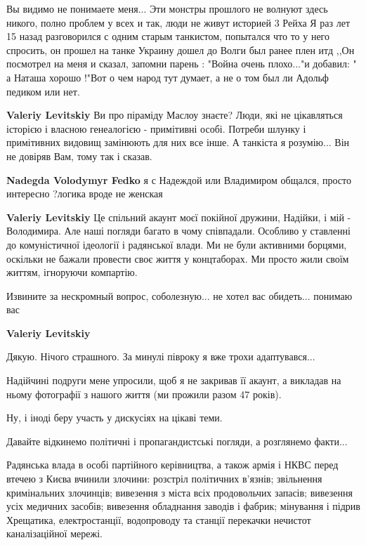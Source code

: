 \begin{itemize}
\begin{itemize}

Вы видимо не понимаете меня... Эти монстры прошлого не волнуют здесь никого,
полно проблем у всех и так, люди не живут историей 3 Рейха Я раз лет 15 назад
разговорился с одним старым танкистом, попытался что то у него спросить, он
прошел на танке Украину дошел до Волги был ранее плен итд ,,Он посмотрел на
меня и сказал, запомни парень : "Война очень плохо..."и добавил: " а Наташа
хорошо !"Вот о чем народ тут думает, а не о том был ли Адольф педиком или нет.

\begin{itemize} %
\textbf{Valeriy Levitskiy} Ви про піраміду Маслоу знаєте? Люди, які не цікавляться історією і власною генеалогією - примітивні особі. Потреби шлунку і примітивних видовищ замінюють для них все інше.
А танкіста я розумію... Він не довіряв Вам, тому так і сказав.

\textbf{Nadegda Volodymyr Fedko} я с Надеждой или Владимиром общался, просто интересно ?логика вроде не женская

\textbf{Valeriy Levitskiy} Це спільний акаунт моєї покійної дружини, Надійки, і мій - Володимира.
Але наші погляди багато в чому співпадали. Особливо у ставленні до комуністичної ідеології і радянської влади.
Ми не були активними борцями, оскільки не бажали провести своє життя у концтаборах. Ми просто жили своїм життям, ігноруючи компартію.
\end{itemize} %


Извините за нескромный вопрос, соболезную... не хотел вас обидеть... понимаю
вас

\textbf{Valeriy Levitskiy} 

Дякую. Нічого страшного. За минулі півроку я вже трохи адаптувався...

Надійчині подруги мене упросили, щоб я не закривав її акаунт, а викладав на
ньому фотографії з нашого життя (ми прожили разом 47 років).

Ну, і іноді беру участь у дискусіях на цікаві теми.

\end{itemize} %


Давайте відкинемо політичні і пропагандистські погляди, а розглянемо факти...

Радянська влада в особі партійного керівництва, а також армія і НКВС перед
втечею з Києва вчинили злочини: розстріл політичних в'язнів; звільнення
кримінальних злочинців; вивезення з міста всіх продовольчих запасів; вивезення
усіх медичних засобів; вивезення обладнання заводів і фабрик; мінування і
підрив Хрещатика, електростанції, водопроводу та станції перекачки нечистот
каналізаційної мережі.


\end{itemize}
